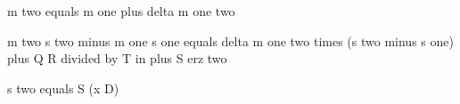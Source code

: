 m two equals m one plus delta m one two  

m two s two minus m one s one equals delta m one two times (s two minus s one) plus Q R divided by T in plus S erz two  

s two equals S (x D)